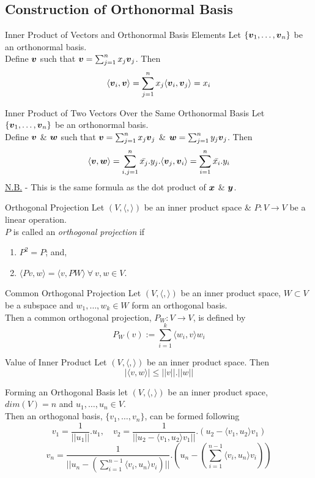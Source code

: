 \documentclass[11pt,a4paper]{article}
\begin{document}
\subsection{Construction of Orthonormal Basis}

\subtitle{Theorem 9.10 - }{Inner Product of Vectors and Orthonormal Basis Elements}
Let $\{\boldsymbol{v}_1, \dots , \boldsymbol{v}_n\}$ be an orthonormal basis.\\
Define $\boldsymbol{v}$ such that $\boldsymbol{v} = \sum_{j=1}^n x_j \boldsymbol{v}_j$. Then\\
$$\langle\boldsymbol{v}_i, \boldsymbol{v}\rangle = \sum_{j=1}^n x_j \langle\boldsymbol{v}_i, \boldsymbol{v}_j \rangle = x_i$$

\subtitle{Theorem 9.11 - }{Inner Product of Two Vectors Over the Same Orthonormal Basis}
Let $\{\boldsymbol{v}_1, \dots , \boldsymbol{v}_n\}$ be an orthonormal basis.\\
Define $\boldsymbol{v}$ \& $\boldsymbol{w}$ such that $\boldsymbol{v} = \sum_{j=1}^n x_j \boldsymbol{v}_j$ \& $\boldsymbol{w} = \sum_{j=1}^n y_j \boldsymbol{v}_j$. Then\\
$$\langle \boldsymbol{v}, \boldsymbol{w} \rangle = \sum_{i,j=1}^n \bar{x_j}.y_j.\langle \boldsymbol{v}_j, \boldsymbol{v}_i \rangle = \sum_{i=1}^n \bar{x_i}.y_i$$
\underline{N.B.} - This is the same formula as the dot product of $\boldsymbol{x}$ \& $\boldsymbol{y}$.\\

\subtitle{Definition 9.12 - }{Orthogonal Projection}
Let $(V, \langle,\rangle)$ be an inner product space \& $P : V \to V$ be a linear operation.\\
$P$ is called an \textit{orthogonal projection} if
\begin{enumerate}[label=\roman*)]
  \item $P^2 = P$; and,
  \item $\langle Pv, w\rangle = \langle v, PW\rangle\ \forall\ v, w \in V$.
\end{enumerate}

\subtitle{Proposition 9.13 - }{Common Orthogonal Projection}
Let $(V, \langle, \rangle)$ be an inner product space, $W \subset V$ be a subspace and $w_1, \dots , w_k \in W$ form an orthogonal basis.\\
Then a common orthogonal projection, $P_W : V \to V$, is defined by
$$P_W(v) := \sum_{i=1}^k \langle w_i, v \rangle w_i$$

\subtitle{Theorem 9.14 - }{Value of Inner Product}
Let $(V, \langle , \rangle)$ be an inner product space. Then
$$|\langle v, w \rangle| \leq ||v||.||w||$$

\subtitle{Theorem 9.15 - }{Forming an Orthogonal Basis}
let $(V, \langle,\rangle)$ be an inner product space, $dim(V) = n$ and $u_1 , \dots , u_n \in V$.\\
Then an orthogonal basis, $\{v_1, \dots , v_n\}$, can be formed following
$$v_1 = \frac{1}{||u_1||}.u_1, \quad v_2 = \frac{1}{||u_2 - \langle v_1, u_2\rangle v_1||}.(u_2 - \langle v_1, u_2\rangle v_1)$$
$$v_n = \frac{1}{||u_n - (\sum_{i=1}^{n-1}\langle v_i, u_n\rangle v_i)||}.\left(u_n - \left(\sum_{i=1}^{n-1}\langle v_i, u_n\rangle v_i\right)\right)$$\\
\end{document}
